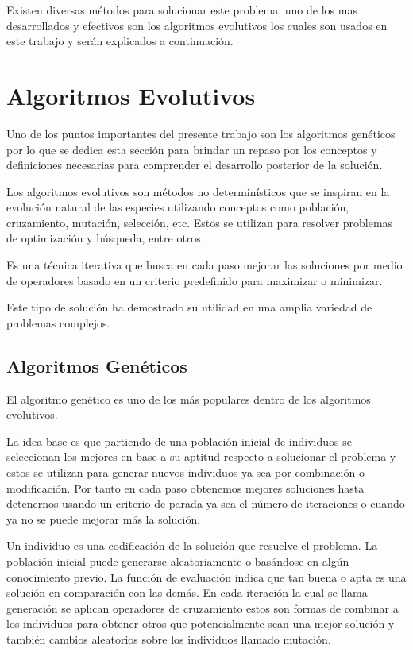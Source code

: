 Existen diversas métodos para solucionar este problema, uno de los mas desarrollados y efectivos son los algoritmos evolutivos los cuales son usados en este trabajo y serán explicados a continuación.

\section{Algoritmos Evolutivos}

Uno de los puntos importantes del presente trabajo son los algoritmos genéticos por lo que se dedica esta sección para  brindar un repaso por los conceptos y definiciones necesarias para comprender el desarrollo posterior de la solución.

Los algoritmos evolutivos son métodos no determinísticos que se inspiran en la evolución natural de las especies utilizando conceptos como población, cruzamiento, mutación, selección, etc. Estos se utilizan para resolver problemas de optimización y búsqueda, entre otros \citep{Nesmachnow2002}.

Es una técnica iterativa que busca en cada paso mejorar las soluciones por medio de operadores basado en un criterio predefinido para maximizar o minimizar.

Este tipo de solución ha demostrado su utilidad en una amplia variedad de problemas complejos.


\subsection{Algoritmos Genéticos}
El algoritmo genético es uno de los más populares dentro de los algoritmos evolutivos.

La idea base es que partiendo de una población inicial de individuos se seleccionan los mejores en base a su aptitud respecto a solucionar el problema y estos se utilizan para generar nuevos individuos ya sea por combinación o modificación. Por tanto en cada paso obtenemos mejores soluciones hasta detenernos usando un criterio de parada ya sea el número de iteraciones o cuando ya no se puede mejorar más la solución.

Un individuo es una codificación de la solución que resuelve el problema.
La población inicial puede generarse aleatoriamente o basándose en algún conocimiento previo.
La función de evaluación indica que tan buena o apta es una solución en comparación con las demás.
En cada iteración la cual se llama generación se aplican operadores de cruzamiento estos son formas de combinar a los individuos para obtener otros que potencialmente sean una mejor solución y también cambios aleatorios sobre los individuos llamado mutación.

